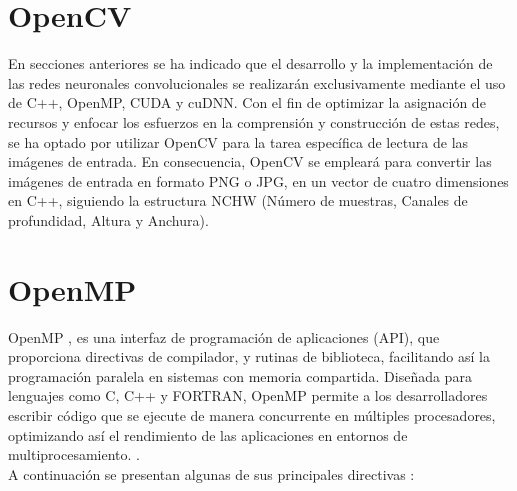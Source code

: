\section{OpenCV}

En secciones anteriores se ha indicado que el desarrollo y la implementación de las redes neuronales convolucionales se realizarán exclusivamente mediante el uso de C++, OpenMP, CUDA y cuDNN. Con el fin de optimizar la asignación de recursos y enfocar los esfuerzos en la comprensión y construcción de estas redes, se ha optado por utilizar OpenCV \cite{opencv} para la tarea específica de lectura de las imágenes de entrada. En consecuencia, OpenCV se empleará para convertir las imágenes de entrada en formato PNG o JPG, en un vector de cuatro dimensiones en C++, siguiendo la estructura NCHW (Número de muestras, Canales de profundidad, Altura y Anchura).

\section{OpenMP}

OpenMP \cite{openmp_intro}, es una interfaz de programación de aplicaciones (API), que proporciona directivas de compilador, y rutinas de biblioteca, facilitando así la programación paralela en sistemas con memoria compartida. Diseñada para lenguajes como C, C++ y FORTRAN, OpenMP permite a los desarrolladores escribir código que se ejecute de manera concurrente en múltiples procesadores, optimizando así el rendimiento de las aplicaciones en entornos de multiprocesamiento. \cite{openmp_intro}. \\

A continuación se presentan algunas de sus principales directivas \cite{openmp_directivas}:

